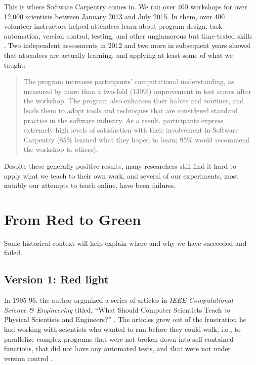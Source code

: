\documentclass[10pt,a4paper,twocolumn]{article}
\begin{document}
This is where Software Carpentry comes in. We ran over 400 workshops
for over 12,000 scientists between January 2013 and July 2015. In
them, over 400 volunteer instructors helped attendees learn about
program design, task automation, version control, testing, and other
unglamorous but time-tested skills \cite{wilson2013}. Two independent
assessments in 2012 \cite{aranda2012,libarkin2012} and two more in
subsequent years \cite{schossau2014,simperler2015} showed that
attendees are actually learning, and applying at least some of what we
taught:

\begin{quote}
The program increases participants' computational understanding, as
measured by more than a two-fold (130\%) improvement in test scores
after the workshop. The program also enhances their habits and routines,
and leads them to adopt tools and techniques that are considered
standard practice in the software industry. As a result, participants
express extremely high levels of satisfaction with their involvement in
Software Carpentry (85\% learned what they hoped to learn; 95\% would
recommend the workshop to others).
\end{quote}

Despite these generally positive results, many researchers still find it
hard to apply what we teach to their own work, and several of our
experiments, most notably our attempts to teach online, have been
failures.

\section*{From Red to Green}

Some historical context will help explain where and why we have
succeeded and failed.

\subsection*{Version 1: Red light}

In 1995-96, the author organized a series of articles in \emph{IEEE
Computational Science \& Engineering} titled, ``What Should Computer
Scientists Teach to Physical Scientists and Engineers?'' \cite{wilson1996}.
The articles grew out of the frustration he had working with scientists
who wanted to run before they could walk, i.e., to parallelize complex
programs that were not broken down into self-contained functions, that
did not have any automated tests, and that were not under version control
\cite{wilson2006a}.
\end{document}
